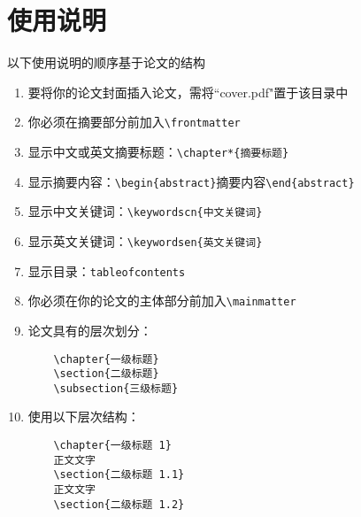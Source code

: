 \documentclass{bjfuthesis}
\begin{document}
\chapter{使用说明}
以下使用说明的顺序基于论文的结构
\begin{enumerate}
\item 要将你的论文封面插入论文，需将``cover.pdf"置于该目录中
\item 你必须在摘要部分前加入\verb|\frontmatter|
\item 显示中文或英文摘要标题：\verb|\chapter*{摘要标题}|
\item 显示摘要内容：\verb|\begin{abstract}|摘要内容\verb|\end{abstract}|
\item 显示中文关键词：\verb|\keywordscn{中文关键词}|
\item 显示英文关键词：\verb|\keywordsen{英文关键词}|
\item 显示目录：\verb|tableofcontents|
\item 你必须在你的论文的主体部分前加入\verb|\mainmatter|
\item 论文具有的层次划分：
\begin{verbatim}
	\chapter{一级标题}
	\section{二级标题}
	\subsection{三级标题}
\end{verbatim}
\item 使用以下层次结构：
\begin{verbatim}
	\chapter{一级标题 1}
	正文文字
	\section{二级标题 1.1}
	正文文字
	\section{二级标题 1.2}

\end{verbatim}
\end{enumerate}
\end{document}
